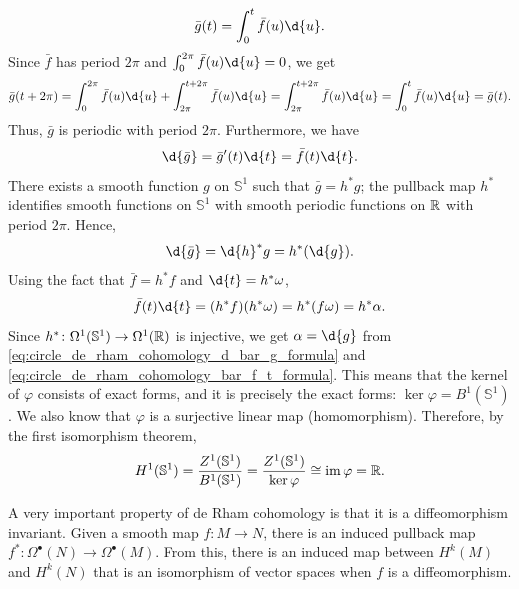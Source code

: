 \documentclass[a4paper,12pt]{article}
\begin{document}
\begin{example}
\begin{equation}
        \bar{g}(t) = \int_0^t \bar{f}(u) \d{u}.
    \end{equation}
    Since $\bar{f}$ has period $2\pi$ and $\int_0^{2\pi} \bar{f}(u) \d{u} = 0$, we get
    \begin{equation*}
        \bar{g}(t + 2\pi) = \int_0^{2\pi} \bar{f}(u) \d{u} + \int_{2\pi}^{t+2\pi} \bar{f}(u) \d{u} = \int_{2\pi}^{t+2\pi} \bar{f}(u) \d{u} = \int_0^t \bar{f}(u) \d{u} = \bar{g}(t).
    \end{equation*}
    Thus, $\bar{g}$ is periodic with period $2\pi$.
    Furthermore, we have
    \begin{equation}
        \d{\bar{g}} = \bar{g}'(t) \d{t} = \bar{f}(t) \d{t}.
    \end{equation}
    There exists a smooth function $g$ on $\mathbb{S}^1$ such that $\bar{g} = h^*g$; the pullback map $h^*$ identifies smooth functions on $\mathbb{S}^1$ with smooth periodic functions on $\mathbb{R}$ with period $2\pi$.
    Hence,
    \begin{equation}\label{eq:circle_de_rham_cohomology_d_bar_g_formula}
        \d{\bar{g}} = \d{h}^*g = h^*(\d{g}).
    \end{equation}
    Using the fact that $\bar{f} = h^*f$ and $\d{t} = h^*\omega$,
    \begin{equation}\label{eq:circle_de_rham_cohomology_bar_f_t_formula}
        \bar{f}(t) \d{t} = (h^*f)(h^*\omega) = h^*(f\omega) = h^*\alpha.
    \end{equation}
    Since $h^* \colon \Omega^1(\mathbb{S}^1) \to \Omega^1(\mathbb{R})$ is injective, we get $\alpha = \d{g}$ from \eqref{eq:circle_de_rham_cohomology_d_bar_g_formula} and \eqref{eq:circle_de_rham_cohomology_bar_f_t_formula}.
    This means that the kernel of $\varphi$ consists of exact forms, and it is precisely the exact forms: $\ker \varphi = B^1(\mathbb{S}^1)$.
    We also know that $\varphi$ is a surjective linear map (homomorphism).
    Therefore, by the first isomorphism theorem,
    \begin{equation}
        H^1(\mathbb{S}^1) = \frac{Z^1(\mathbb{S}^1)}{B^1(\mathbb{S}^1)} = \frac{Z^1(\mathbb{S}^1)}{\ker \varphi} \cong \operatorname{im} \varphi = \mathbb{R}.
    \end{equation}
\end{example}
A very important property of de Rham cohomology is that it is a diffeomorphism invariant.
Given a smooth map $f \colon M \to N$, there is an induced pullback map $f^* \colon \Omega^\bullet(N) \to \Omega^\bullet(M)$. 
From this, there is an induced map between $H^k(M)$ and $H^k(N)$ that is an isomorphism of vector spaces when $f$ is a diffeomorphism.
\end{document}
